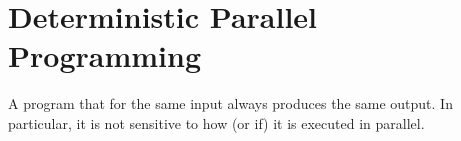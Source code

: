 \chapter{Deterministic Parallel Programming}

\begin{definition}
  A program that for the same input always produces the same output.
  In particular, it is not sensitive to how (or if) it is executed in
  parallel.
\end{definition}


